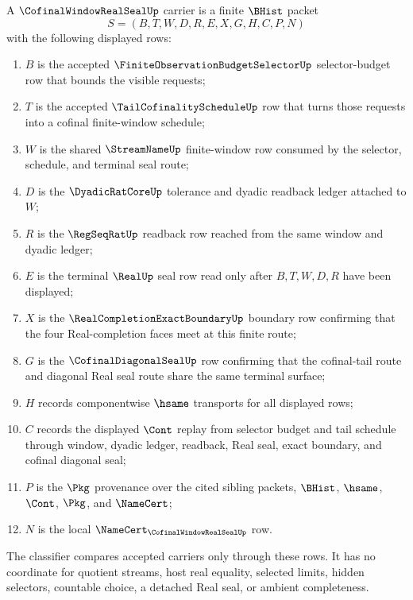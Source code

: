 \begin{definition}
\label{def:cofinal-window-real-seal-carrier}
A $\CofinalWindowRealSealUp$ carrier is a finite $\BHist$ packet
$$
S=(B,T,W,D,R,E,X,G,H,C,P,N)
$$
with the following displayed rows:
\begin{enumerate}
\item $B$ is the accepted $\FiniteObservationBudgetSelectorUp$ selector-budget row that bounds the visible requests;
\item $T$ is the accepted $\TailCofinalityScheduleUp$ row that turns those requests into a cofinal finite-window schedule;
\item $W$ is the shared $\StreamNameUp$ finite-window row consumed by the selector, schedule, and terminal seal route;
\item $D$ is the $\DyadicRatCoreUp$ tolerance and dyadic readback ledger attached to $W$;
\item $R$ is the $\RegSeqRatUp$ readback row reached from the same window and dyadic ledger;
\item $E$ is the terminal $\RealUp$ seal row read only after $B,T,W,D,R$ have been displayed;
\item $X$ is the $\RealCompletionExactBoundaryUp$ boundary row confirming that the four Real-completion faces meet at this finite route;
\item $G$ is the $\CofinalDiagonalSealUp$ row confirming that the cofinal-tail route and diagonal Real seal route share the same terminal surface;
\item $H$ records componentwise $\hsame$ transports for all displayed rows;
\item $C$ records the displayed $\Cont$ replay from selector budget and tail schedule through window, dyadic ledger, readback, Real seal, exact boundary, and cofinal diagonal seal;
\item $P$ is the $\Pkg$ provenance over the cited sibling packets, $\BHist$, $\hsame$, $\Cont$, $\Pkg$, and $\NameCert$;
\item $N$ is the local $\NameCert_{\CofinalWindowRealSealUp}$ row.
\end{enumerate}
The classifier compares accepted carriers only through these rows. It has no coordinate for quotient streams, host real equality, selected limits, hidden selectors, countable choice, a detached Real seal, or ambient completeness.
\end{definition}

